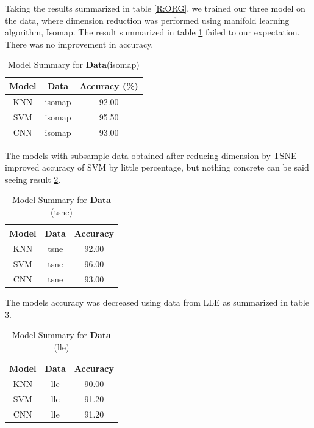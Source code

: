 Taking the results summarized in table \ref{R:ORG}, we trained our three model on the data, where dimension reduction was performed using manifold learning algorithm, Isomap. The result summarized in table \ref{R:ISO} failed to our expectation. There was no improvement in accuracy.


\begin{table}[ht!]
\caption{Model Summary for $\mathbf{Data}$(isomap)}
\centering
\begin{tabular}{c c c }
\hline\hline
Model & Data & Accuracy (\%)\\ [0.5ex]
\hline
KNN & isomap & 92.00 \\
SVM & isomap & 95.50 \\
CNN & isomap & 93.00\\ [1ex]
\hline
\end{tabular}
\label{R:ISO}
\end{table}

The models with subsample data obtained after reducing dimension by TSNE improved accuracy of SVM by little percentage, but nothing concrete can be said seeing result \ref{R:TSNE}.

\begin{table}[ht]
\caption{Model Summary for $\mathbf{Data}$(tsne)}
\centering
\begin{tabular}{c c c }
\hline\hline
Model & Data & Accuracy\\ [0.5ex]
\hline
KNN & tsne & 92.00 \\
SVM & tsne & 96.00 \\
CNN & tsne & 93.00\\ [1ex]
\hline
\end{tabular}
\label{R:TSNE}
\end{table}

The models accuracy was decreased using data from LLE as summarized in table \ref{R:LLE}.

\begin{table}[ht]
\caption{Model Summary for $\mathbf{Data}$(lle)}
\centering
\begin{tabular}{c c c }
\hline\hline
Model & Data & Accuracy\\ [0.5ex]
\hline
KNN & lle & 90.00 \\
SVM & lle & 91.20 \\
CNN & lle & 91.20\\ [1ex]
\hline
\end{tabular}
\label{R:LLE}
\end{table}

